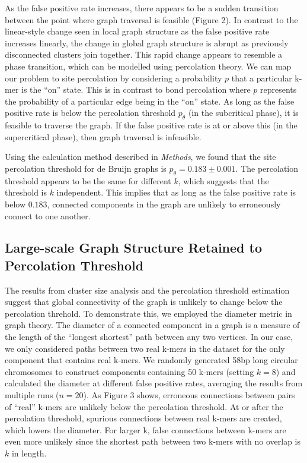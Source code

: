 \documentclass[12pt]{article} \usepackage{simplemargins}
\begin{document}
As the false positive rate increases, there appears to be a sudden
transition between the point where graph traversal is feasible (Figure 2). 
In contrast to the linear-style change seen 
in local graph structure as the false positive rate increases linearly, 
the change in global graph structure is abrupt as previously disconnected 
clusters join together.  
This rapid change appears to resemble a phase transition, which can be 
modelled using percolation theory. We can map 
our problem to site percolation by considering a probability $p$ that a 
particular k-mer is the ``on'' state. This is in contrast to bond percolation where 
$p$ represents the probability of a particular edge being in the ``on'' state. As
long as the false positive rate is below the percolation threshold $p_\theta$ (in
the subcritical phase), it is feasible to traverse the graph. If the
false positive rate is at or above this (in the supercritical phase), then graph
traversal is infeasible.

Using the calculation method described in \emph{Methods}, we found that the 
site percolation threshold for de Bruijn graphs is $p_\theta = 0.183 \pm 0.001$. 
The percolation threshold appears to be the same for 
different $k$, which suggests that the 
threshold is $k$ independent. This implies that as long as the 
false positive rate is below $0.183$, connected components in the graph 
are unlikely to erroneously connect to one another.

\subsection{Large-scale Graph Structure Retained to Percolation Threshold}
The results from cluster size analysis and the percolation threshold 
estimation suggest that 
global connectivity of the graph is unlikely 
to change below the percolation threhold. To demonstrate this, we employed 
the diameter metric in graph theory.  
The diameter of a connected component in a graph is a measure of 
the length of the ``longest shortest'' 
path between any two vertices\cite{bondy2008graph}.
In our case, we only considered paths between two real k-mers
in the dataset for the only component that contains real k-mers. 
We randomly generated 58bp long circular
chromosomes to construct components containing 50 k-mers (setting $k=8$) and 
calculated the diameter at different false positive rates, averaging
the results from multiple runs ($n=20$).
As Figure 3 shows, 
erroneous connections between pairs of ``real'' k-mers are unlikely
below the 
percolation threshold. At or after the percolation threshold, spurious connections 
between real k-mers are created, which lowers the diameter. For larger k, false connections 
between k-mers are even more unlikely since the shortest path between two k-mers 
with no overlap is $k$ in length.
\end{document}
